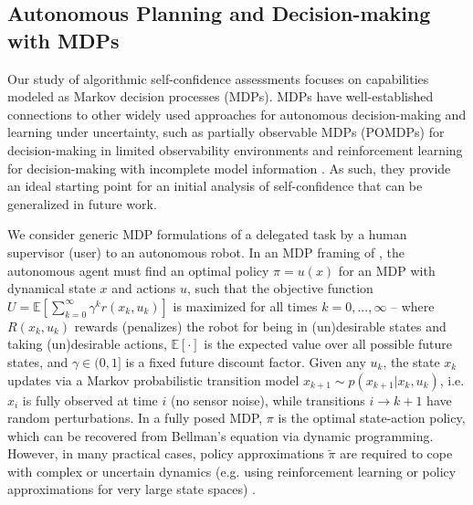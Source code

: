 \subsection{Autonomous Planning and Decision-making with MDPs} \label{sec:mdp}
Our study of algorithmic self-confidence assessments focuses on capabilities modeled as Markov decision processes (MDPs). %
MDPs have well-established connections to other widely used approaches for autonomous decision-making and learning under uncertainty, such as partially observable MDPs (POMDPs) for decision-making in limited observability environments and reinforcement learning for decision-making with incomplete model information \cite{Kochenderfer2015-uu}. As such, they provide an ideal starting point for an initial analysis of self-confidence that can be generalized in future work. 

We consider generic MDP formulations of a delegated task \task{} by a human supervisor (user) to an autonomous robot. In an MDP framing of \task{}, the autonomous agent must find an optimal policy $\pi = u(x)$ for an MDP with dynamical state $x$ and actions $u$, such that the objective function
$U = \mathbb{E} \left[\sum_{k=0}^{\infty} \gamma^k r(x_k,u_k) \right]$ is maximized for all times $k=0,...,\infty$ --  
where $R(x_k,u_k)$ rewards (penalizes) the robot for being in (un)desirable states and taking (un)desirable actions, $\mathbb{E}[\cdot]$ is the expected value over all possible future states, and $\gamma \in (0,1]$ is a fixed future discount factor. 
Given any $u_k$, the state $x_k$ updates via a Markov probabilistic transition model $x_{k+1} \sim p(x_{k+1}|x_{k},u_{k})$,  
i.e. $x_{i}$ is fully observed at time $i$ (no sensor noise), while transitions $i\rightarrow k+1$ have random perturbations.
In a fully posed MDP, $\pi$ is the optimal state-action policy, which can be recovered from Bellman's equation via dynamic programming. 
However, in many practical cases, policy approximations $\tilde{\pi}$ are required to cope with complex or uncertain dynamics (e.g. using reinforcement learning or policy approximations for very large state spaces) \cite{Kochenderfer2015-uu}. 

